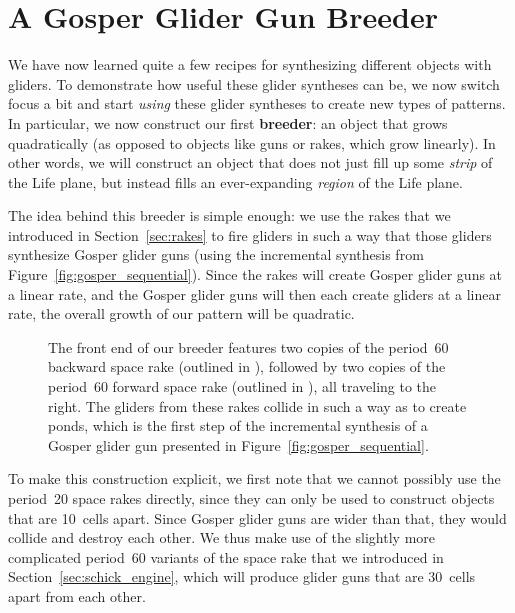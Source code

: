 \section{A Gosper Glider Gun Breeder}\label{sec:gosper_breeder}

We have now learned quite a few recipes for synthesizing different objects with gliders. To demonstrate how useful these glider syntheses can be, we now switch focus a bit and start \emph{using} these glider syntheses to create new types of patterns. In particular, we now construct our first \textbf{breeder}: an object that grows quadratically (as opposed to objects like guns or rakes, which grow linearly). In other words, we will construct an object that does not just fill up some \emph{strip} of the Life plane, but instead fills an ever-expanding \emph{region} of the Life plane.

The idea behind this breeder is simple enough: we use the rakes that we introduced in Section~\ref{sec:rakes} to fire gliders in such a way that those gliders synthesize Gosper glider guns (using the incremental synthesis from Figure~\ref{fig:gosper_sequential}). Since the rakes will create Gosper glider guns at a linear rate, and the Gosper glider guns will then each create gliders at a linear rate, the overall growth of our pattern will be quadratic.

\begin{figure}[!htb]
	\centering
	\caption{The front end of our breeder features two copies of the period~60 backward space rake (outlined in ), followed by two copies of the period~60 forward space rake (outlined in ), all traveling to the right. The gliders from these rakes collide in such a way as to create ponds, which is the first step of the incremental synthesis of a Gosper glider gun presented in Figure~\ref{fig:gosper_sequential}.}\label{fig:breeder_front}
\end{figure}

To make this construction explicit, we first note that we cannot possibly use the period~20 space rakes directly, since they can only be used to construct objects that are 10~cells apart. Since Gosper glider guns are wider than that, they would collide and destroy each other. We thus make use of the slightly more complicated period~60 variants of the space rake that we introduced in Section~\ref{sec:schick_engine}, which will produce glider guns that are 30~cells apart from each other.


